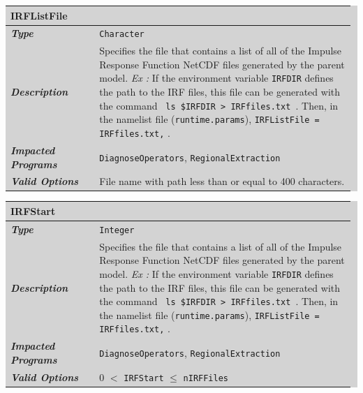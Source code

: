 \documentclass{softwaremanual}
\begin{document}
\noindent\begingroup\setlength{\fboxsep}{0pt}
\colorbox{lightgray}{
\begin{tabular}{p{0.25\linewidth} p{0.725\linewidth}}
\toprule
\textbf{IRFListFile} & \\
\midrule
\textbf{\textit{Type}} & \texttt{Character} \\
\midrule
\textbf{\textit{Description}} & Specifies the file that contains a list of all of the Impulse Response Function NetCDF files generated by the parent model. \textit{Ex :} If the environment variable \texttt{IRFDIR} defines the path to the IRF files, this file can be generated with the command \texttt{ ls \$IRFDIR > IRFfiles.txt }. Then, in the namelist file (\texttt{runtime.params}), \texttt{IRFListFile = IRFfiles.txt,} . \\
\midrule
\textbf{\textit{Impacted Programs}} & \texttt{DiagnoseOperators}, \texttt{RegionalExtraction} \\
\midrule
\textbf{\textit{Valid Options}}  & File name with path less than or equal to 400 characters. \\
\bottomrule
\end{tabular}
}\endgroup

\noindent\begingroup\setlength{\fboxsep}{0pt}
\colorbox{lightgray}{
\begin{tabular}{p{0.25\linewidth} p{0.725\linewidth}}
\toprule
\textbf{IRFStart} & \\
\midrule
\textbf{\textit{Type}} & \texttt{Integer} \\
\midrule
\textbf{\textit{Description}} & Specifies the file that contains a list of all of the Impulse Response Function NetCDF files generated by the parent model. \textit{Ex :} If the environment variable \texttt{IRFDIR} defines the path to the IRF files, this file can be generated with the command \texttt{ ls \$IRFDIR > IRFfiles.txt }. Then, in the namelist file (\texttt{runtime.params}), \texttt{IRFListFile = IRFfiles.txt,} . \\
\midrule
\textbf{\textit{Impacted Programs}} & \texttt{DiagnoseOperators}, \texttt{RegionalExtraction} \\
\midrule
\textbf{\textit{Valid Options}}  & 0 $<$ \texttt{IRFStart} $\leq$ \texttt{nIRFFiles}  \\
\bottomrule
\end{tabular}
}\endgroup
\end{document}
